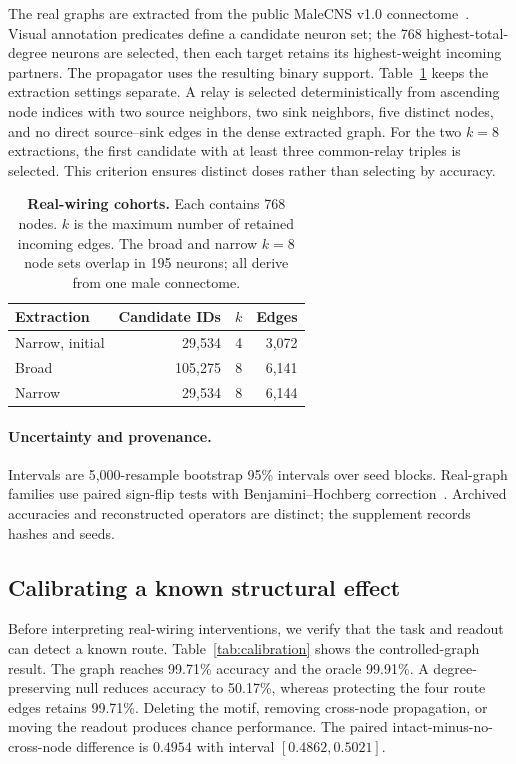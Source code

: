 The real graphs are extracted from the public MaleCNS v1.0
connectome~\cite{malecns2026}. Visual annotation predicates define a
candidate neuron set; the 768 highest-total-degree neurons are selected,
then each target retains its highest-weight incoming partners. The
propagator uses the resulting binary support. Table~\ref{tab:graphs}
keeps the extraction settings separate. A relay is selected
deterministically from ascending node indices with two source neighbors,
two sink neighbors, five distinct nodes, and no direct source--sink edges
in the dense extracted graph. For the two $k=8$ extractions, the first
candidate with at least three common-relay triples is selected. This
criterion ensures distinct doses rather than selecting by accuracy.

\begin{table}[t]
\centering
\caption{\textbf{Real-wiring cohorts.} Each contains 768 nodes.
$k$ is the maximum number of retained incoming edges.
The broad and narrow $k=8$ node sets overlap in 195 neurons; all derive
from one male connectome.}
\label{tab:graphs}
\small
\begin{tabular}{lrrr}
\toprule
Extraction & Candidate IDs & $k$ & Edges \\
\midrule
Narrow, initial & 29,534 & 4 & 3,072 \\
Broad & 105,275 & 8 & 6,141 \\
Narrow & 29,534 & 8 & 6,144 \\
\bottomrule
\end{tabular}
\end{table}

\paragraph{Uncertainty and provenance.}
Intervals are 5,000-resample bootstrap 95\% intervals over seed blocks.
Real-graph families use paired sign-flip tests with Benjamini--Hochberg
correction~\cite{benjamini1995}. Archived accuracies and reconstructed
operators are distinct; the supplement records hashes and seeds.

\subsection{Calibrating a known structural effect}
\label{sec:calibration}

Before interpreting real-wiring interventions, we verify that the task and
readout can detect a known route. Table~\ref{tab:calibration} shows the
controlled-graph result. The graph reaches 99.71\% accuracy and the oracle
99.91\%. A degree-preserving null reduces accuracy to 50.17\%, whereas
protecting the four route edges retains 99.71\%. Deleting the motif,
removing cross-node propagation, or moving the readout produces chance
performance. The paired intact-minus-no-cross-node difference is
$0.4954$ with interval $[0.4862,0.5021]$.

